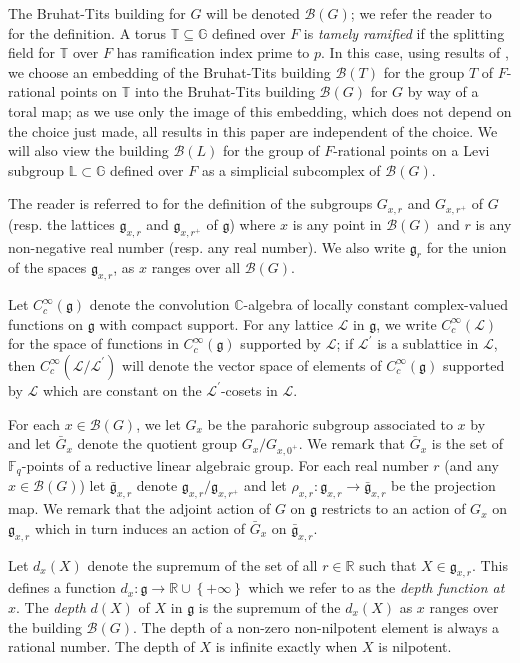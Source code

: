 \documentclass[11pt]{amsart}
\theoremstyle{definition}
\theoremstyle{remark}
\numberwithin{equation}{theorem}
\def\R{{\mathbb{R}}}
\def\C{{\mathbb{C}}}
\def\F{{F}}
\def\GF{{G}}
\def\TF{{T}}
\def\LF{{L}}
\def\gF{{\mathfrak{g}}}
\newcommand{\Mf}{{\bar\GF}}
\newcommand{\mf}{{\bar\gF}}
\def\B{{\mathcal{B}}}
\def\Sch#1{{C^\infty_c(#1)}}
\def\rightcoset{{ / }}
\newcommand{\G}{{\mathbb{G}}}
\newcommand{\T}{{\mathbb{T}}}
\def\Fq{{\mathbb F}_q}
\begin{document}
The Bruhat-Tits building for $\GF$ will be denoted $\B(\GF)$; we
refer the reader to \cite{Bruhat-Tits II} for the definition.  A
torus $\T\subseteq\G$ defined over $\F$ is \emph{tamely ramified}
if the splitting field for $\T$ over $\F$ has ramification index
prime to $p$. In this case, using results of \cite{L}, we choose
an embedding of the Bruhat-Tits building $\B(\TF)$ for the group
$\TF$ of $\F$-rational points on $\T$ into the Bruhat-Tits
building $\B(\GF)$ for $\GF$ by way of a toral map; as we use only
the image of this embedding, which does not depend on the choice
just made, all results in this paper are independent of the
choice. We will also view the building $\B(\LF)$ for the group of
$\F$-rational points on a Levi subgroup $\mathbb{L}\subset \G$
defined over $\F$ as a simplicial subcomplex of $\B(\GF)$.


The reader is referred to \cite{Moy-Prasad} for the definition of
the subgroups $\GF_{x,r}$  and $\GF_{x,r^+}$ of $\GF$ (resp. the
lattices $\gF_{x,r}$ and $\gF_{x,r^+}$ of $\gF$) where $x$ is any
point in $\B(\GF)$ and $r$ is any non-negative real number (resp.
any real number). We also write $\gF_{r}$ for the union of the
spaces $\gF_{x,r}$, as $x$ ranges over all $\B(\GF)$.

Let $\Sch{\gF}$ denote the convolution $\C$-algebra of locally
constant complex-valued functions on $\gF$ with compact support.
For any lattice $\mathcal{L}$ in $\gF$, we write
$\Sch{\mathcal{L}}$ for the space of functions in $\Sch{\gF}$
supported by $\mathcal{L}$; if $\mathcal{L}^\prime$ is a
sublattice in $\mathcal{L}$, then
$\Sch{\mathcal{L}/\mathcal{L}^\prime}$ will denote the vector
space of elements of $\Sch{\gF}$ supported by $\mathcal{L}$ which
are constant on the $\mathcal{L}^\prime$-cosets in $\mathcal{L}$.

For each $x\in \B(\GF)$, we let $\GF_x$ be the parahoric subgroup
associated to $x$ by \cite{Bruhat-Tits II} and let $\Mf_x$ denote
the quotient group $\GF_x\rightcoset\GF_{x,0^+}$. We remark that
$\Mf_x$ is the set of $\Fq$-points of a reductive linear algebraic
group. For each real number $r$ (and any $x\in \B(\GF)$) let
$\mf_{x,r}$ denote $\gF_{x,r}\rightcoset\gF_{x,r^+}$ and let
$\rho_{x,r} : \gF_{x,r} \to \mf_{x,r}$ be the projection map. We
remark that the adjoint action of $\GF$ on $\gF$ restricts to an
action of $\GF_x$ on $\gF_{x,r}$ which in turn induces an action
of $\Mf_x$ on $\mf_{x,r}$.

Let $d_x(X)$ denote the supremum of the set of all $r\in \R$ such
that $X \in \gF_{x,r}$. This defines a function $d_x: \gF \to \R
\cup \left\{+\infty\right\}$ which we refer to as the {\em depth
function at $x$}. The {\em depth} $d(X)$ of $X$ in $\gF$ is the
supremum of the $d_x(X)$ as $x$ ranges over the building
$\B(\GF)$. The depth of a non-zero non-nilpotent element is always
a rational number. The depth of $X$ is infinite exactly when $X$
is nilpotent.
\end{document}
